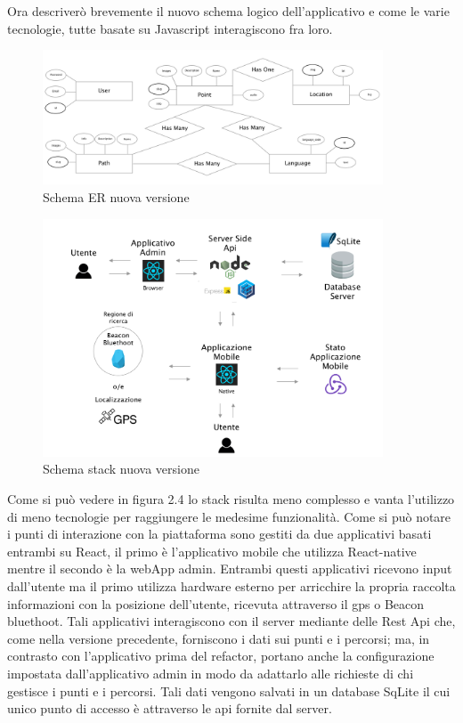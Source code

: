 Ora descriverò brevemente il nuovo schema logico dell'applicativo e come le varie tecnologie, tutte basate su Javascript interagiscono fra loro.
	
\begin{figure}[h]
\centering
\includegraphics[width=0.9\textwidth]{images/erNew.png}
\caption{Schema ER nuova versione}
\end{figure}
	
	
\begin{figure}[h]
\centering
\includegraphics[width=0.9\textwidth]{images/stackAlakai.png}
\caption{Schema stack nuova versione}
\end{figure}

\vspace{5mm}Come si può vedere in figura 2.4 lo stack risulta meno complesso e vanta l'utilizzo di meno tecnologie per raggiungere le medesime funzionalità. Come si può notare i punti di interazione con la piattaforma sono gestiti da due applicativi basati entrambi su React, il primo è l'applicativo mobile che utilizza React-native mentre il secondo è la webApp admin. Entrambi questi applicativi ricevono input dall'utente ma il primo utilizza hardware esterno per arricchire la propria raccolta informazioni con la posizione dell'utente, ricevuta attraverso il gps o Beacon bluethoot. Tali applicativi interagiscono con il server mediante delle Rest Api che, come nella versione precedente, forniscono i dati sui punti e i percorsi; ma, in contrasto con l'applicativo prima del refactor, portano anche la configurazione impostata dall'applicativo admin in modo da adattarlo alle richieste di chi gestisce i punti e i percorsi. Tali dati vengono salvati in un database SqLite il cui unico punto di accesso è attraverso le api fornite dal server. \vspace{5mm}

